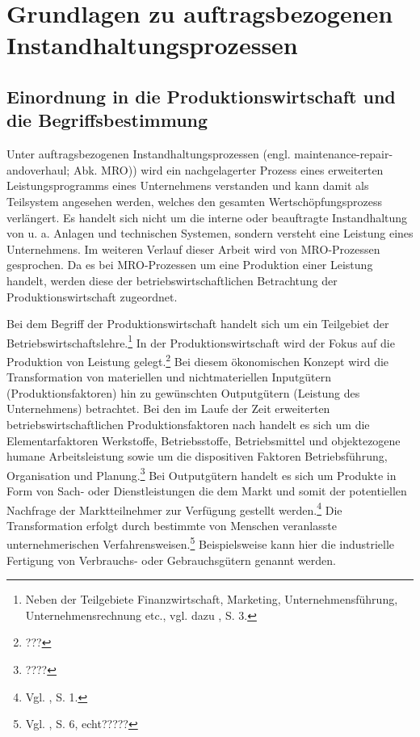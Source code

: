 \chapter{Grundlagen zu auftragsbezogenen Instandhaltungsprozessen}\label{Instandhaltung}
\setcounter{footnote}{4}  %

\section{Einordnung in die Produktionswirtschaft und die Begriffsbestimmung}

Unter auftragsbezogenen Instandhaltungsprozessen (engl. maintenance-repair-and\-overhaul; Abk. MRO)) wird ein nachgelagerter Prozess eines erweiterten Leistungsprogramms eines Unternehmens verstanden und kann damit als Teilsystem angesehen werden, welches den gesamten Wertschöpfungsprozess verlängert. Es handelt sich nicht um die interne oder beauftragte Instandhaltung von u. a. Anlagen und technischen Systemen, sondern versteht eine Leistung eines Unternehmens. Im weiteren Verlauf dieser Arbeit wird von MRO-Prozessen gesprochen. Da es bei MRO-Prozessen um eine Produktion einer Leistung handelt, werden diese der betriebswirtschaftlichen Betrachtung der Produktionswirtschaft zugeordnet.

Bei dem Begriff der Produktionswirtschaft handelt sich um ein Teilgebiet der Betriebswirtschaftslehre.\footnote{Neben der Teilgebiete Finanzwirtschaft, Marketing, Unternehmensführung, Unternehmensrechnung etc., vgl. dazu \cite{Dyckhoff2010}, S. 3.} In der Produktionswirtschaft wird der Fokus auf die Produktion von Leistung gelegt.\footnote{???} Bei diesem ökonomischen Konzept wird die Transformation von materiellen und nichtmateriellen Inputgütern (Produktionsfaktoren) hin zu gewünschten Outputgütern (Leistung des Unternehmens) betrachtet. Bei den im Laufe der Zeit erweiterten betriebswirtschaftlichen Produktionsfaktoren nach \citet[S. 71]{Gutenberg:1959aa} handelt es sich um die Elementarfaktoren Werkstoffe, Betriebsstoffe, Betriebsmittel und objektezogene humane Arbeitsleistung sowie um die dispositiven Faktoren Betriebsführung, Organisation und Planung.\footnote{????} Bei Outputgütern handelt es sich um Produkte in Form von Sach- oder Dienstleistungen die dem Markt und somit der potentiellen Nachfrage der Marktteilnehmer zur Verfügung gestellt werden.\footnote{Vgl. \cite{Schmidt:2012aa}, S. 1.} Die Transformation erfolgt durch bestimmte von Menschen veranlasste unternehmerischen Verfahrensweisen.\footnote{Vgl. \cite{tempelmeier1994produktion}, S. 6, echt?????} Beispielsweise kann hier die industrielle Fertigung von Verbrauchs- oder Gebrauchsgütern genannt werden.

